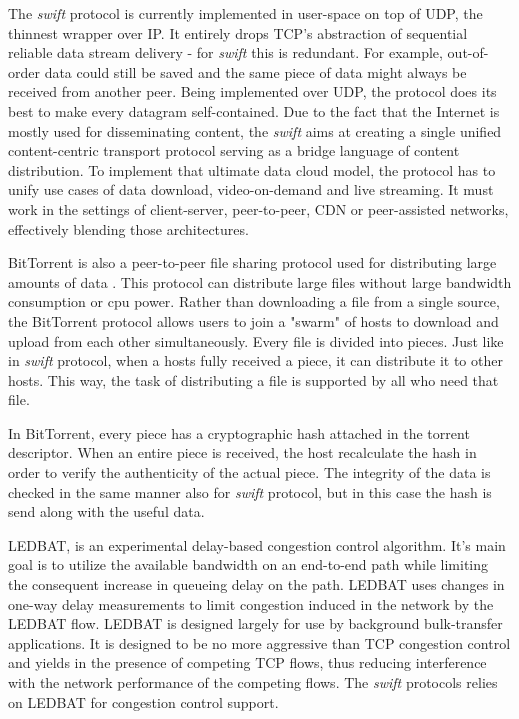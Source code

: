 
The \emph{swift} protocol is currently implemented in user-space on top of UDP,  the thinnest wrapper over IP. It
entirely drops TCP's abstraction of sequential reliable data stream delivery - for \emph{swift} this is redundant. For
example, out-of-order data could still be saved and the same piece of data might always be received from another peer.
Being implemented over UDP, the protocol does its best to make every datagram self-contained. Due to the fact that the 
Internet is mostly used for disseminating content, the \emph{swift} aims at creating a single unified content-centric
transport protocol serving as a bridge language of content distribution. To implement that ultimate data cloud model,
the protocol has to unify use cases of data download, video-on-demand and live streaming. It must work in the settings
of client-server, peer-to-peer\cite{peer-to-peer}, CDN or peer-assisted networks, effectively blending those
architectures.


BitTorrent is also a peer-to-peer file sharing protocol used for distributing large amounts of data \cite{bittorrent}.
This protocol can distribute large files without large bandwidth consumption or cpu power. Rather than downloading a
file from a single source, the BitTorrent protocol allows users to join a "swarm" of hosts to download and upload from
each other simultaneously. Every file is divided into pieces. Just like in \emph{swift} protocol, when a hosts fully
received a piece, it can distribute it to other hosts. This way, the task of distributing a file is supported by all who
need that file.

In BitTorrent, every piece has a cryptographic hash attached in the torrent descriptor. When an entire piece is
received, the host recalculate the hash in order to verify the authenticity of the actual piece. The integrity of the
data is checked in the same manner also for \emph{swift} protocol, but in this case the hash is send along with the
useful data.  

LEDBAT\cite{ledbat}, \cite{ledbat2} is an experimental delay-based congestion control algorithm. It's main goal is to
utilize the available bandwidth on an end-to-end path while limiting the consequent increase in queueing delay on the
path. LEDBAT uses changes in one-way delay measurements to limit congestion induced in the network by the LEDBAT flow.
LEDBAT is designed largely for use by background bulk-transfer applications. It is designed to be no more aggressive
than TCP congestion control and yields in the presence of competing TCP flows, thus reducing interference with the
network performance of the competing flows. The \emph{swift} protocols relies on LEDBAT for congestion control support.
